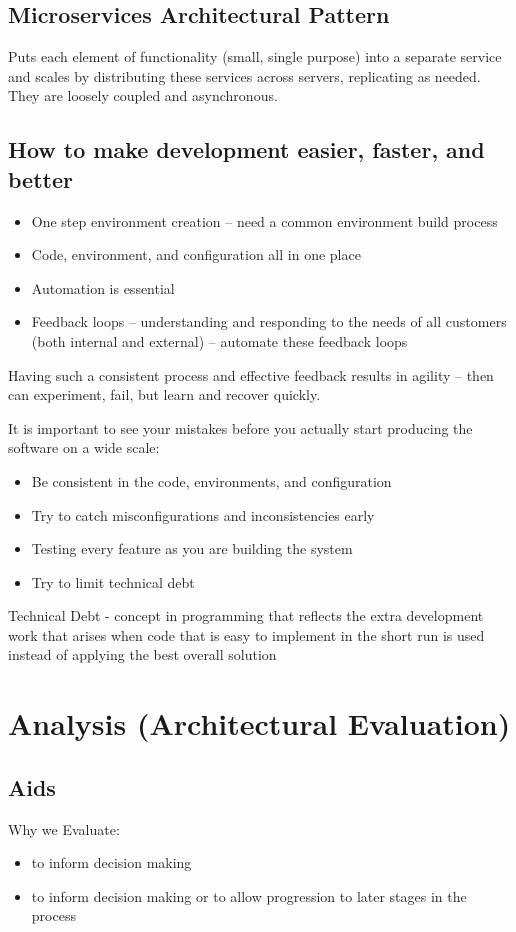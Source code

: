\documentclass[a4paper]{report}
\begin{document}
\section{Microservices Architectural Pattern}
Puts each element of functionality (small, single purpose) into a separate service and scales by distributing these services across servers, replicating as needed. They are loosely coupled and asynchronous.

\section{How to make development easier, faster, and better}
\begin{itemize}
\item One step environment creation – need a common environment build process
\item Code, environment, and configuration all in one place
\item Automation is essential
\item Feedback loops – understanding and responding to the needs of all customers (both internal and external) – automate these feedback loops
\end{itemize}
Having such a consistent process and effective feedback results in agility – then can experiment, fail, but learn and recover quickly.

It is important to see your mistakes before you actually start producing the software on a wide scale: 
\begin{itemize}
\item Be consistent in the code, environments, and configuration
\item Try to catch misconfigurations and inconsistencies early
\item Testing every feature as you are building the system
\item Try to limit technical debt 
\end{itemize}
Technical Debt - concept in programming that reflects the extra development work that arises when code that is easy to implement in the short run is used instead of applying the best overall solution


\chapter{Analysis (Architectural Evaluation)}
\section{Aids}
Why we Evaluate:
\begin{itemize}
\item to inform decision making
\item to	inform	decision	making	or	to	allow	
progression	to	later	stages	in	the	process
\end{itemize}
\end{document}
